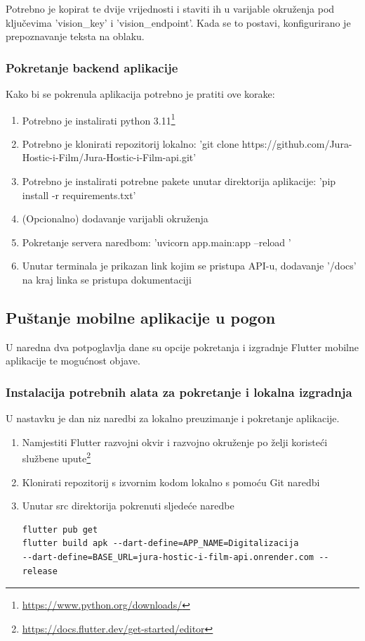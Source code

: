 			{Potrebno je kopirat te dvije vrijednosti i staviti ih u varijable okruženja pod ključevima 'vision\_key' i 'vision\_endpoint'. Kada se to postavi, konfigurirano je prepoznavanje teksta na oblaku.}
			
			\subsubsection{Pokretanje backend aplikacije}
			
			{Kako bi se pokrenula aplikacija potrebno je pratiti ove korake:}
			
			\begin{enumerate}
				\item{Potrebno je instalirati python 3.11\footnote{\url{https://www.python.org/downloads/}}}
				\item{Potrebno je klonirati repozitorij lokalno: 'git clone https://github.com/Jura-Hostic-i-Film/Jura-Hostic-i-Film-api.git'}
				\item{Potrebno je instalirati potrebne pakete unutar direktorija aplikacije: 'pip install -r requirements.txt'}
				\item{(Opcionalno) dodavanje varijabli okruženja}
				\item{Pokretanje servera naredbom: 'uvicorn app.main:app --reload '}
				\item{Unutar terminala je prikazan link kojim se pristupa API-u, dodavanje '/docs' na kraj linka se pristupa dokumentaciji}
			\end{enumerate}
			
			\subsection{Puštanje mobilne aplikacije u pogon}
			
			{U naredna dva potpoglavlja dane su opcije pokretanja i izgradnje Flutter mobilne aplikacije te mogućnost objave.}
			
			\subsubsection{Instalacija potrebnih alata za pokretanje i lokalna izgradnja}
			
			{U nastavku je dan niz naredbi za lokalno preuzimanje i pokretanje aplikacije.}
			\begin{enumerate}
			\item{Namjestiti Flutter razvojni okvir i razvojno okruženje po želji koristeći službene upute\footnote{\url{https://docs.flutter.dev/get-started/editor}}}
			\item{Klonirati repozitorij s izvornim kodom lokalno s pomoću Git naredbi}
			\item{Unutar src direktorija pokrenuti sljedeće naredbe}
			\begin{verbatim}
flutter pub get
flutter build apk --dart-define=APP_NAME=Digitalizacija 
--dart-define=BASE_URL=jura-hostic-i-film-api.onrender.com --release
			\end{verbatim}
			\end{enumerate}
			

